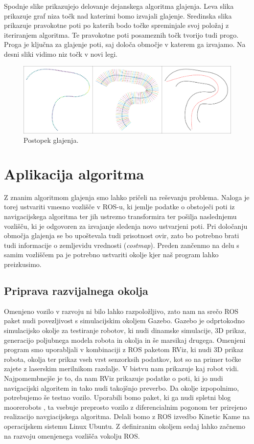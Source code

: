 \documentclass[10pt,a4paper]{article}
\begin{document}
Spodnje slike prikazujejo delovanje dejanskega algoritma glajenja. Leva slika prikazuje graf niza točk nad katerimi bomo  izvajali glajenje. Sredinska slika prikazuje pravokotne poti po katerih bodo točke spreminjale svoj položaj z iteriranjem algoritma. Te pravokotne poti posameznih točk tvorijo tudi progo. Proga je ključna za glajenje poti, saj določa območje v katerem ga izvajamo. Na desni sliki vidimo niz točk v novi legi.

\begin{figure}[H]
	\centering
	\includegraphics[width=15cm]{pic/slika6.png}
	\caption{Postopek glajenja.}
	\label{fig:slika}
\end{figure}

\section{Aplikacija algoritma}

Z znanim algoritmom glajenja smo lahko pričeli na reševanju problema. Naloga je torej ustvariti vmesno vozlišče v ROS-u, ki jemlje podatke o obstoječi poti iz navigacijskega algoritma ter jih ustrezno transformira ter pošilja naslednjemu vozlišču, ki je odgovoren za izvajanje sledenja novo ustvarjeni poti. Pri določanju območja glajenja se bo upoštevala tudi prisotnost ovir, zato bo potrebno brati tudi informacije o zemljevidu vrednosti (\textit{costmap}). Preden zančenmo na delu s samim vozliščem pa je potrebno ustvariti okolje kjer naš program lahko preizkusimo.

\subsection{Priprava razvijalnega okolja}

Omenjeno vozilo v razvoju ni bilo lahko razpoložljivo, zato nam na srečo ROS paket nudi povezljivost s simulacijskim okoljem Gazebo. Gazebo je odprtokodno simulacijsko okolje za testiranje robotov, ki nudi dinamske simulacije, 3D prikaz, generacijo poljubnega modela robota in okolja in še marsikaj drugega. Omenjeni program smo uporabljali v kombinaciji z ROS paketom RViz, ki nudi 3D prikaz robota, okolja ter prikaz vseh vrst senzorksih podatkov, kot so na primer točke zajete z laserskim merilnikom razdalje. V bistvu nam prikazuje kaj robot vidi. Najpomembnejše je to, da nam RViz prikazuje podatke o poti, ki jo nudi navigacijski algoritem in tako nudi takojšnjo preverbo. Da okolje izpopolnimo, potrebujemo še testno vozilo. Uporabili bomo paket, ki ga nudi spletni blog moorerobots \cite{moorerobots}, ta vsebuje preprosto vozilo z diferencialnim pogonom ter prirejeno realizacijo navgiacijskega algoritma. Delali bomo z ROS izvedbo Kinetic Kame na operacijskem sistemu Linux Ubuntu. Z definiranim okoljem sedaj lahko začnemo na razvoju omenjenega vozlišča vokolju ROS.
\end{document}
